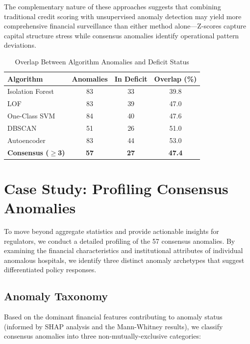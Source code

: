 \documentclass{ieeeaccess}
\begin{document}
The complementary nature of these approaches suggests that combining traditional credit scoring with unsupervised anomaly detection may yield more comprehensive financial surveillance than either method alone---Z-scores capture capital structure stress while consensus anomalies identify operational pattern deviations.

\begin{table}[!t]
\centering
\caption{Overlap Between Algorithm Anomalies and Deficit Status}
\label{tab:overlap}
\begin{tabular}{@{}lccc@{}}
\toprule
\textbf{Algorithm} & \textbf{Anomalies} & \textbf{In Deficit} & \textbf{Overlap (\%)} \\
\midrule
Isolation Forest & 83 & 33 & 39.8 \\
LOF & 83 & 39 & 47.0 \\
One-Class SVM & 84 & 40 & 47.6 \\
DBSCAN & 51 & 26 & 51.0 \\
Autoencoder & 83 & 44 & 53.0 \\
\midrule
\textbf{Consensus ($\geq$3)} & \textbf{57} & \textbf{27} & \textbf{47.4} \\
\bottomrule
\end{tabular}
\end{table}

\section{Case Study: Profiling Consensus Anomalies}
\label{sec:casestudy}

To move beyond aggregate statistics and provide actionable insights for regulators, we conduct a detailed profiling of the 57 consensus anomalies. By examining the financial characteristics and institutional attributes of individual anomalous hospitals, we identify three distinct anomaly archetypes that suggest differentiated policy responses.

\subsection{Anomaly Taxonomy}
\label{subsec:taxonomy}

Based on the dominant financial features contributing to anomaly status (informed by SHAP analysis and the Mann-Whitney results), we classify consensus anomalies into three non-mutually-exclusive categories:
\end{document}
